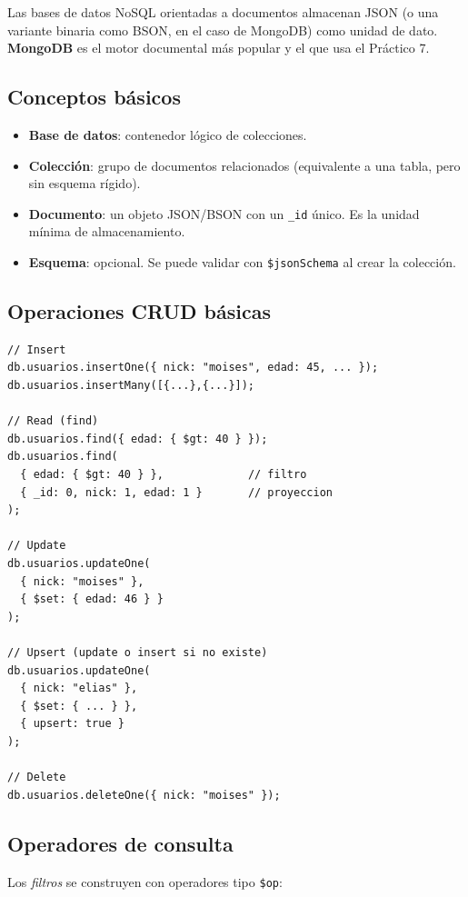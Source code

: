 \documentclass[11pt,a4paper]{article}
\begin{document}
Las bases de datos NoSQL orientadas a documentos almacenan JSON (o una
variante binaria como BSON, en el caso de MongoDB) como unidad de dato.
\textbf{MongoDB} es el motor documental más popular y el que usa el
Práctico 7.

\subsection{Conceptos básicos}

\begin{itemize}
    \item \textbf{Base de datos}: contenedor lógico de colecciones.
    \item \textbf{Colección}: grupo de documentos relacionados
    (equivalente a una tabla, pero sin esquema rígido).
    \item \textbf{Documento}: un objeto JSON/BSON con un \texttt{\_id}
    único. Es la unidad mínima de almacenamiento.
    \item \textbf{Esquema}: opcional. Se puede validar con
    \texttt{\$jsonSchema} al crear la colección.
\end{itemize}

\subsection{Operaciones CRUD básicas}

\begin{lstlisting}
// Insert
db.usuarios.insertOne({ nick: "moises", edad: 45, ... });
db.usuarios.insertMany([{...},{...}]);

// Read (find)
db.usuarios.find({ edad: { $gt: 40 } });
db.usuarios.find(
  { edad: { $gt: 40 } },             // filtro
  { _id: 0, nick: 1, edad: 1 }       // proyeccion
);

// Update
db.usuarios.updateOne(
  { nick: "moises" },
  { $set: { edad: 46 } }
);

// Upsert (update o insert si no existe)
db.usuarios.updateOne(
  { nick: "elias" },
  { $set: { ... } },
  { upsert: true }
);

// Delete
db.usuarios.deleteOne({ nick: "moises" });
\end{lstlisting}

\subsection{Operadores de consulta}

Los \emph{filtros} se construyen con operadores tipo \texttt{\$op}:
\end{document}
